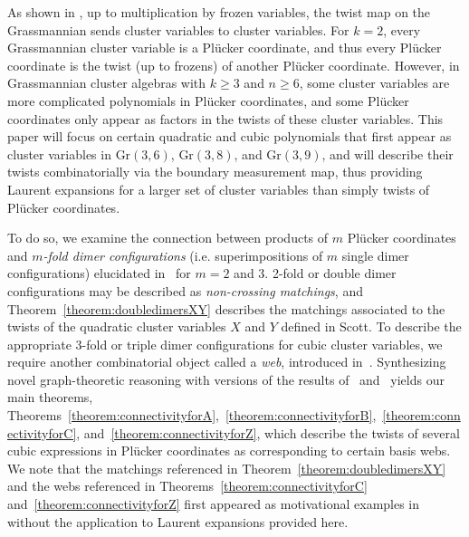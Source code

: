\documentclass[11pt]{article}
\theoremstyle{definition}
\numberwithin{equation}{section}
\def\Gr {{\textrm{Gr}}}
\numberwithin{equation}{section}
\begin{document}
As shown in \cite[Prop. 8.10]{marshscott2016}, up to multiplication by frozen variables, the twist map on the Grassmannian sends cluster variables to cluster variables.
For $k=2$, every Grassmannian cluster variable is a Pl\"ucker coordinate, and thus every Pl\"ucker coordinate is the twist (up to frozens) of another Pl\"ucker coordinate. However, in Grassmannian cluster algebras with $k \geq 3$ and $n \geq 6$, some cluster variables are more complicated polynomials in Pl\"ucker coordinates, and some Pl\"ucker coordinates only appear as factors in the twists of these cluster variables.
This paper will focus on certain quadratic and cubic polynomials that first appear as cluster variables in $\Gr(3,6)$, $\Gr(3,8)$, and $\Gr(3,9)$, and will describe their twists combinatorially via the boundary measurement map, thus providing Laurent expansions for a larger set of cluster variables than simply twists of Pl\"ucker coordinates.


To do so, we examine the connection between products of $m$ Pl\"ucker coordinates and \textit{$m$-fold dimer configurations} (i.e. superimpositions of $m$ single dimer configurations) elucidated in~\cite{lam2015} for $m=2$ and $3$. 2-fold or double dimer configurations may be described as \textit{non-crossing matchings}, and Theorem~\ref{theorem:doubledimersXY} describes the matchings associated to the twists of the quadratic cluster variables $X$ and $Y$ defined in Scott. 
To describe the appropriate 3-fold or triple dimer configurations for cubic cluster variables, we require another combinatorial object called a \textit{web}, introduced in~\cite{kup96}. Synthesizing novel graph-theoretic reasoning with versions of the results of~\cite{marshscott2016} and~\cite{mullerspeyer} yields our main theorems, Theorems~\ref{theorem:connectivityforA},~\ref{theorem:connectivityforB},~\ref{theorem:connectivityforC}, and~\ref{theorem:connectivityforZ}, which describe the twists of several cubic expressions in Pl\"ucker coordinates as corresponding to certain basis webs. We note that the matchings referenced in Theorem~\ref{theorem:doubledimersXY} and the webs referenced in Theorems~\ref{theorem:connectivityforC} and~\ref{theorem:connectivityforZ} first appeared as motivational examples in~\cite{fll2019} without the application to Laurent expansions provided here.
\end{document}

